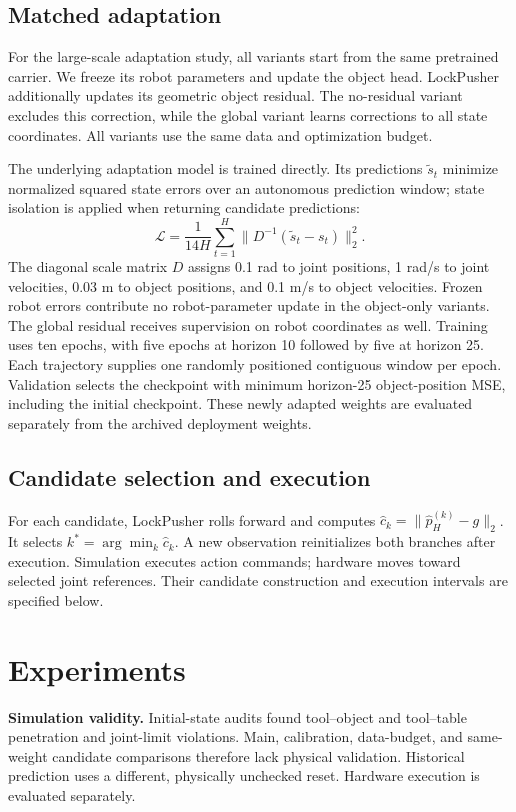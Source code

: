 \documentclass[conference]{IEEEtran}
\begin{document}
\subsection{Matched adaptation}
For the large-scale adaptation study, all variants start from the same pretrained carrier. We freeze its robot parameters and update the object head. LockPusher additionally updates its geometric object residual. The no-residual variant excludes this correction, while the global variant learns corrections to all state coordinates. All variants use the same data and optimization budget.

The underlying adaptation model is trained directly. Its predictions $\tilde s_t$ minimize normalized squared state errors over an autonomous prediction window; state isolation is applied when returning candidate predictions:
\begin{equation}
\mathcal L=\frac{1}{14H}\sum_{t=1}^{H}\|D^{-1}(\tilde s_t-s_t)\|_2^2.
\end{equation}
The diagonal scale matrix $D$ assigns 0.1 rad to joint positions, 1 rad/s to joint velocities, 0.03 m to object positions, and 0.1 m/s to object velocities. Frozen robot errors contribute no robot-parameter update in the object-only variants. The global residual receives supervision on robot coordinates as well. Training uses ten epochs, with five epochs at horizon 10 followed by five at horizon 25. Each trajectory supplies one randomly positioned contiguous window per epoch. Validation selects the checkpoint with minimum horizon-25 object-position MSE, including the initial checkpoint. These newly adapted weights are evaluated separately from the archived deployment weights.

\subsection{Candidate selection and execution}
For each candidate, LockPusher rolls forward and computes $\hat c_k=\|\hat p_H^{(k)}-g\|_2$. It selects $k^*=\arg\min_k\hat c_k$. A new observation reinitializes both branches after execution. Simulation executes action commands; hardware moves toward selected joint references. Their candidate construction and execution intervals are specified below.


\section{Experiments}
\label{sec:experiments}
\textbf{Simulation validity.} Initial-state audits found tool--object and tool--table penetration and joint-limit violations. Main, calibration, data-budget, and same-weight candidate comparisons therefore lack physical validation. Historical prediction uses a different, physically unchecked reset. Hardware execution is evaluated separately.
\end{document}
